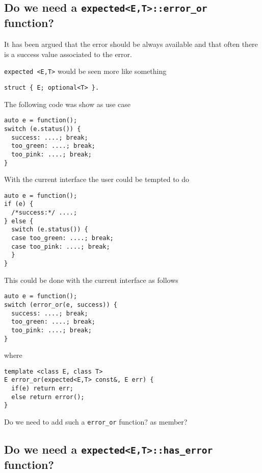 \documentclass[a4paper,10pt]{article}
\newcommand{\cpp}[1]{\lstinline{#1}}
\begin{document}
\subsection{Do we need a  \cpp{expected<E,T>::error_or} function?}

It has been argued that the error should be always available and that often there is a success value associated to the error.

\cpp{expected <E,T>} would be seen more like something  

\begin{lstlisting}
struct { E; optional<T> }. 
\end{lstlisting}

\noindent
The following code was show as use case

\begin{lstlisting}
auto e = function();
switch (e.status()) {
  success: ....; break;
  too_green: ....; break;
  too_pink: ....; break;
} 
\end{lstlisting}

\noindent
With the current interface the user could be tempted to do

\begin{lstlisting}
auto e = function();
if (e) {
  /*success:*/ ....;
} else {
  switch (e.status()) {
  case too_green: ....; break;
  case too_pink: ....; break;
  }
} 
\end{lstlisting}

\noindent
This could be done with the current interface as follows

\begin{lstlisting}
auto e = function();
switch (error_or(e, success)) {
  success: ....; break;
  too_green: ....; break;
  too_pink: ....; break;
} 
\end{lstlisting}

\noindent
where

\begin{lstlisting}
template <class E, class T>
E error_or(expected<E,T> const&, E err) {
  if(e) return err;
  else return error();
}
\end{lstlisting}

\noindent
Do we need to add such a \cpp{error_or} function? as member? 

\subsection{Do we need a  \cpp{expected<E,T>::has_error} function?}
\end{document}
